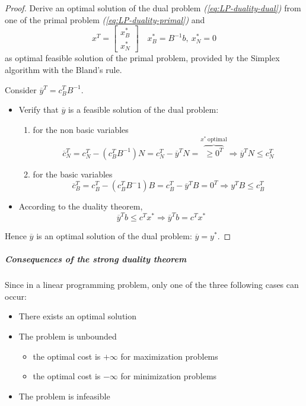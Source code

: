 \documentclass[english]{article}
\begin{document}
\begin{proof}
  Derive an optimal solution of the dual problem \textit{(\ref{eq:LP-duality-dual})} from one of the primal problem \textit{(\ref{eq:LP-duality-primal})} and
  \[ x^T = \begin{bmatrix}
      x_B^\ast \\ x_N^\ast
    \end{bmatrix} \quad x^\ast_B = B^{-1} b, \ x_N^\ast = 0 \]
  as optimal feasible solution of the primal problem, provided by the Simplex algorithm with the Bland's rule.

  Consider \(\overline{y}^T = c_B^T B^{-1}\).
  \begin{itemize}
    \item Verify that \(\overline{y}\) is a feasible solution of the dual problem:
          \begin{enumerate}
            \item for the non basic variables \[ \overline{c}_N^T = c_N^T - \left( c_B^T B^{-1} \right) N = c_N^T - \overline{y}^T N = \displaystyle \overbrace{\geq 0^T}^{x^\ast \ \text{optimal}} \Rightarrow \overline{y}^T N \leq c_N^T \]
            \item for the basic variables \[ \overline{c}_B^T = c_B^T - \left( c_B^T B^-1 \right) B = c_B^T - \overline{y}^T B = 0^T \Rightarrow y^T B \leq c_B^T \]
          \end{enumerate}
    \item According to the duality theorem, \[ \overline{y}^T b \leq c^T x^\ast \Rightarrow \overline{y}^T b = c^T x^\ast \]
  \end{itemize}

  Hence \(\overline{y}\) is an optimal solution of the dual problem: \(\overline{y} = y^\ast\).
\end{proof}

\subparagraph*{Consequences of the strong duality theorem}

Since in a linear programming problem, only one of the three following cases can occur:

\begin{itemize}
  \item There exists an optimal solution
  \item The problem is unbounded
        \begin{itemize}
          \item the optimal cost is \(+\infty\) for maximization problems
          \item the optimal cost is \(-\infty\) for minimization problems
        \end{itemize}
  \item The problem is infeasible
\end{itemize}
\end{document}
